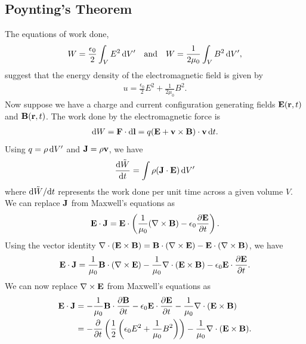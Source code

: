 \subsection{Poynting's Theorem}
The equations of work done,
\begin{align}
    W = \frac{\epsilon_{0}}{2} \int_{V} E^{2} \, \mathrm{d}V' \quad \text{and} \quad W = \frac{1}{2 \mu_{0}} \int_{V} B^{2} \, \mathrm{d}V',
\end{align}
suggest that the energy density of the electromagnetic field is given by
\begin{align}
    u = \frac{\epsilon_{0}}{2} E^{2} + \frac{1}{2 \mu_{0}} B^{2}.
\end{align}
Now suppose we have a charge and current configuration generating fields $\mathbf{E}(\mathbf{r},t)$ and $\mathbf{B}(\mathbf{r},t)$. The work done by the electromagnetic force is
\begin{align}
    \mathrm{d}W = \mathbf{F} \cdot \mathrm{d}\mathbf{l} = q(\mathbf{E} + \mathbf{v} \times \mathbf{B}) \cdot \mathbf{v} \, \mathrm{d}t.
\end{align}
Using $q = \rho \, \mathrm{d}V'$ and $\mathbf{J} = \rho \mathbf{v}$, we have
\begin{align}
    \frac{\mathrm{d}\tilde{W}}{\mathrm{d}t} = \int \rho (\mathbf{J} \cdot \mathbf{E}) \, \mathrm{d}V'
\end{align}
where $\mathrm{d}\tilde{W}/\mathrm{d}t$ represents the work done per unit time across a given volume $V$. We can replace $\mathbf{J}$ from Maxwell's equations as
\begin{align}
    \mathbf{E} \cdot \mathbf{J} = \mathbf{E} \cdot \left( \frac{1}{\mu_{0}} (\nabla \times \mathbf{B}) - \epsilon_{0} \frac{\partial \mathbf{E}}{\partial t} \right).
\end{align}
Using the vector identity $\nabla \cdot (\mathbf{E} \times \mathbf{B}) = \mathbf{B} \cdot (\nabla \times \mathbf{E}) - \mathbf{E} \cdot (\nabla \times \mathbf{B})$, we have
\begin{align}
    \mathbf{E} \cdot \mathbf{J} = \frac{1}{\mu_{0}} \mathbf{B} \cdot (\nabla \times \mathbf{E}) - \frac{1}{\mu_{0}} \nabla \cdot (\mathbf{E} \times \mathbf{B}) - \epsilon_{0} \mathbf{E} \cdot \frac{\partial \mathbf{E}}{\partial t}.
\end{align}
We can now replace $\nabla \times \mathbf{E}$ from Maxwell's equations as
\begin{align}
    \mathbf{E} \cdot \mathbf{J} &= -\frac{1}{\mu_{0}} \mathbf{B} \cdot \frac{\partial \mathbf{B}}{\partial t} - \epsilon_{0} \mathbf{E} \cdot \frac{\partial \mathbf{E}}{\partial t} - \frac{1}{\mu_{0}} \nabla \cdot (\mathbf{E} \times \mathbf{B}) \notag \\
    &= -\frac{\partial}{\partial t} \left( \frac{1}{2} \left( \epsilon_{0} E^{2} + \frac{1}{\mu_{0}} B^{2} \right) \right) - \frac{1}{\mu_{0}} \nabla \cdot (\mathbf{E} \times \mathbf{B}).
\end{align}
